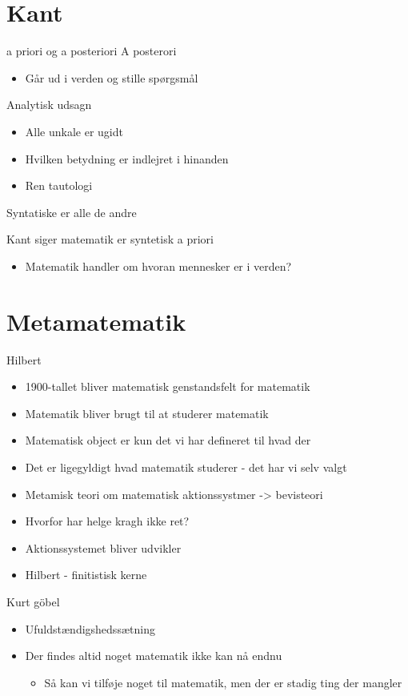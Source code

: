 \documentclass[11pt]{article}
\begin{document}
\section{Kant}
\label{sec:orgbe55487}
a priori og a posteriori
A posterori
\begin{itemize}
\item Går ud i verden og stille spørgsmål
\end{itemize}

Analytisk udsagn
\begin{itemize}
\item Alle unkale er ugidt
\item Hvilken betydning er indlejret i hinanden
\item Ren tautologi
\end{itemize}
Syntatiske er alle de andre

Kant siger matematik er syntetisk a priori
\begin{itemize}
\item Matematik handler om hvoran mennesker er i verden?
\end{itemize}

\section{Metamatematik}
\label{sec:org9fe5018}
Hilbert
\begin{itemize}
\item 1900-tallet bliver matematisk genstandsfelt for matematik
\item Matematik bliver brugt til at studerer matematik
\item Matematisk object er kun det vi har defineret til hvad der
\item Det er ligegyldigt hvad matematik studerer - det har vi selv valgt
\item Metamisk teori om matematisk aktionssystmer -> bevisteori
\item Hvorfor har helge kragh ikke ret?
\item Aktionssystemet bliver udvikler
\item Hilbert - finitistisk kerne
\end{itemize}

Kurt göbel
\begin{itemize}
\item Ufuldstændigshedssætning
\item Der findes altid noget matematik ikke kan nå endnu
\begin{itemize}
\item Så kan vi tilføje noget til matematik, men der er stadig ting der mangler
\end{itemize}
\end{itemize}
\end{document}
